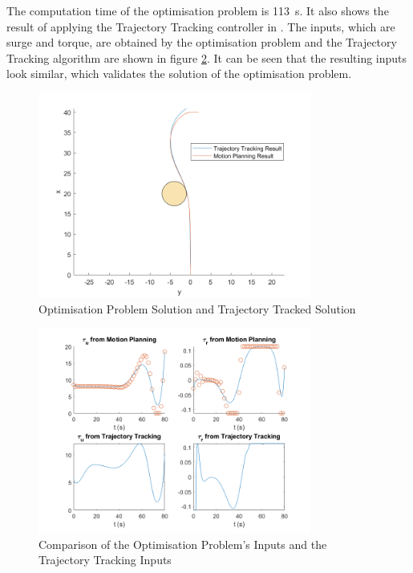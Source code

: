 \par The computation time of the optimisation problem is \SI{113}{\second}. It also shows the result of applying the Trajectory Tracking controller in \cite{Vanni2007CoordinatedMC}. The inputs, which are surge and torque, are obtained by the optimisation problem and the Trajectory Tracking algorithm are shown in figure \ref{fig:inputscomparison}. It can be seen that the resulting inputs look similar, which validates the solution of the optimisation problem.

\begin{figure}[h!]
\centering
\includegraphics[width=0.8\textwidth]{Images/results/trajectrackedprob.png}
\caption{Optimisation Problem Solution and Trajectory Tracked Solution}
\label{fig:trajectrackedprob}
\end{figure}

\begin{figure}[h!]
\centering
\includegraphics[width=0.8\textwidth]{Images/results/inputscomparison.png}
\caption{Comparison of the Optimisation Problem's Inputs and the Trajectory Tracking Inputs}
\label{fig:inputscomparison}
\end{figure}


